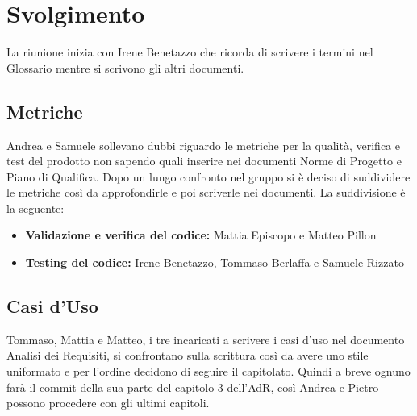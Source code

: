 \section{Svolgimento}
La riunione inizia con Irene Benetazzo che ricorda di scrivere i termini nel Glossario mentre si 
scrivono gli altri documenti.
\subsection{Metriche}
Andrea e Samuele sollevano dubbi riguardo le metriche per la qualità, verifica e test del prodotto 
non sapendo quali inserire nei documenti Norme di Progetto e Piano di Qualifica. \newline
Dopo un lungo confronto nel gruppo si è deciso di suddividere le metriche così da approfondirle e 
poi scriverle nei documenti. La suddivisione è la seguente:
\begin{itemize}
    \item \textbf{Validazione e verifica del codice:} Mattia Episcopo e Matteo Pillon
    \item \textbf{Testing del codice:} Irene Benetazzo, Tommaso Berlaffa e Samuele Rizzato 
\end{itemize}

\subsection{Casi d'Uso}
Tommaso, Mattia e Matteo, i tre incaricati a scrivere i casi d'uso nel documento Analisi dei 
Requisiti, si confrontano sulla scrittura così da avere uno stile uniformato e per l'ordine decidono 
di seguire il capitolato. Quindi a breve ognuno farà il commit della sua parte del 
capitolo 3 dell'AdR, così Andrea e Pietro possono procedere con gli ultimi capitoli.


